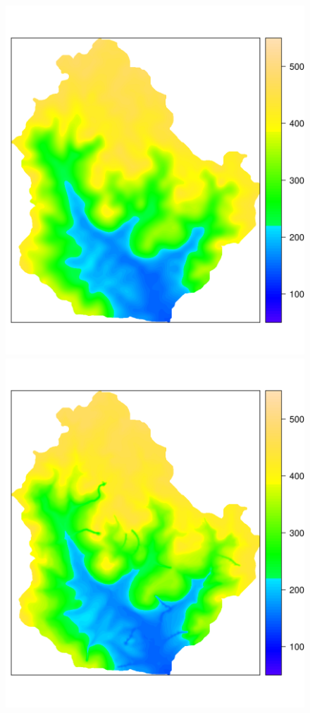 \begin{figure}[!ht]
\centering
\begin{minipage}[b]{0.45\textwidth}
\subcaption{}
\centering
\includegraphics[width = \textwidth]{fig/chap05-dem-old}
\end{minipage}
\begin{minipage}[b]{0.45\textwidth}
\subcaption{}
\centering
\includegraphics[width = \textwidth]{fig/chap05-dem-new}

\end{minipage}
\end{figure}
